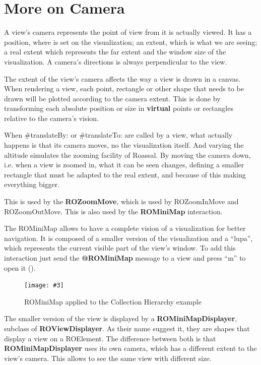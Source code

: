 \documentclass[a4paper,10pt,twoside]{book}
\newcommand{\fig}[4]{
		\begin{figure}[#1]
			\centering
			\texttt{[image: \#3]}
			\caption{\label{fig:#3}#4}
		\end{figure}}
\begin{document}



\section{More on Camera} 

A view's camera represents the point of view from it is actually viewed. It has a position, where is set on the visualization; an extent, which is what we are seeing; a real extent which represents the far extent and the window size of the visualization. A camera's directions is always perpendicular to the view.

The extent of the view's camera affects the way a view is drawn in a canvas. When rendering a view, each point, rectangle or other shape that needs to be drawn will be plotted according to the camera extent. This is done by transforming each absolute position or size in \textbf{virtual} points or rectangles relative to the camera's vision.

When \#translateBy: or \#translateTo: are called by a view, what actually happens is that its camera moves, no the visualization itself. 
And varying the altitude simulates the zooming facility of Roassal. By moving the camera down, i.e. when a view is zoomed in, what it can be seen changes, defining a smaller rectangle that must be adapted to the real extent, and because of this making everything bigger.%

This is used by the \textbf{ROZoomMove}, which is used by ROZoomInMove and ROZoomOutMove. This is also used by the \textbf{ROMiniMap} interaction.

The ROMiniMap allows to have a complete vision of a visualization for better navigation. It is composed of a smaller version of the visualization and a ``lupa'', which represents the current visible part of the view's window. To add this interaction just send the \textbf{@ROMiniMap} message to a view and press ``m'' to open it ().

\fig{H}{0.9}{miniMap}{ROMiniMap applied to the Collection Hierarchy example}

The smaller version of the view is displayed by a \textbf{ROMiniMapDisplayer}, subclass of \textbf{ROViewDisplayer}. 
As their name suggest it, they are shapes that display a view on a ROElement. The difference between both is that \textbf{ROMiniMapDisplayer} uses its own camera, which has a different extent to the view's camera. This allows to see the same view with different size. 
\end{document}
